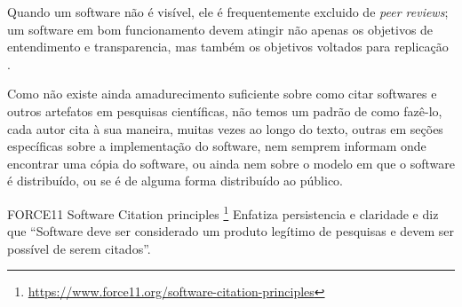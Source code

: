 Quando um software não é visível, ele é frequentemente excluido de {\it peer
reviews}; um software em bom funcionamento devem atingir não apenas os
objetivos de entendimento e transparencia, mas também os objetivos voltados
para replicação \cite{Stodden2010}.

%

Como não existe ainda amadurecimento suficiente sobre como citar softwares e
outros artefatos em pesquisas científicas, não temos um padrão de como fazê-lo,
cada autor cita à sua maneira, muitas vezes ao longo do texto, outras em seções
específicas sobre a implementação do software, nem semprem informam onde
encontrar uma cópia do software, ou ainda nem sobre o modelo em que o software
é distribuído, ou se é de alguma forma distribuído ao público.

FORCE11 Software Citation principles \cite{smith2016software}\footnote{\url{https://www.force11.org/software-citation-principles}}
Enfatiza persistencia e claridade e diz que ``Software deve ser considerado
um produto legítimo de pesquisas e devem ser possível de serem citados''.

%

